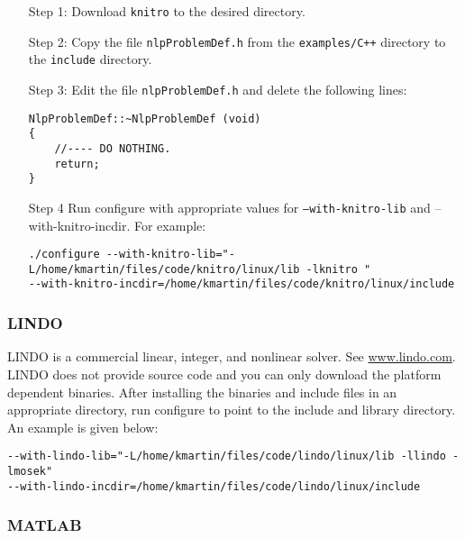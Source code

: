 \documentclass[11pt]{article}
\renewcommand{\_}{{\char"5F}}
\renewcommand{\{}{{\char"7B}}
\renewcommand{\}}{{\char"7D}}
\renewcommand{\^}{{\char"0D}}
\renewcommand{\'}{{\char"0D}}
\begin{document}
\begin{itemize}



\item[Step 1:]  Download {\tt knitro} to the desired directory.


\item[Step 2:] Copy the file {\tt nlpProblemDef.h} from the {\tt examples/C++} directory to the {\tt include} directory.

\item[Step 3:]  Edit the file {\tt nlpProblemDef.h} and delete the following lines:

\begin{verbatim}
NlpProblemDef::~NlpProblemDef (void)
{
    //---- DO NOTHING.
    return;
}
\end{verbatim}




\item[Step 4] Run configure with appropriate values for  {\tt --with-knitro-lib} and {--with-knitro-incdir}. For example:

\begin{verbatim}
./configure --with-knitro-lib="-L/home/kmartin/files/code/knitro/linux/lib -lknitro "
--with-knitro-incdir=/home/kmartin/files/code/knitro/linux/include
\end{verbatim}

\end{itemize}


\subsubsection{LINDO}

LINDO is a commercial linear, integer, and nonlinear solver. See \url{www.lindo.com}.  LINDO does not provide source code and you can only download the platform dependent binaries. After installing the binaries and include files in an appropriate directory, run configure to point to the include and library directory. An example is given below:

\begin{verbatim}
--with-lindo-lib="-L/home/kmartin/files/code/lindo/linux/lib -llindo -lmosek"
--with-lindo-incdir=/home/kmartin/files/code/lindo/linux/include
\end{verbatim}


\subsubsection{MATLAB}
\end{document}
